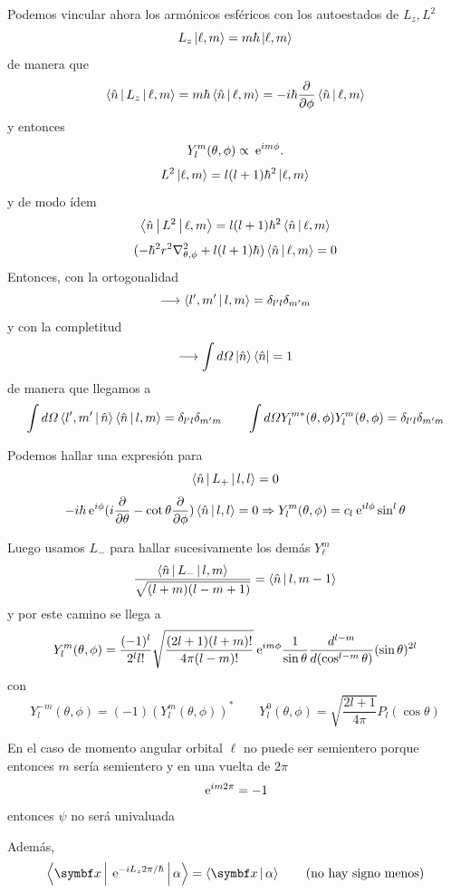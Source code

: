 \documentclass[10pt,oneside]{CBFT_book}
\begin{document}
Podemos vincular ahora los armónicos esféricos con los autoestados de $L_z,L^2$
\[
	L_z \Ket{\ell,m} = m\hbar\Ket{\ell,m}
\]
de manera que 
\[
	\Braket{\hat{n}|L_z|\ell,m} = m\hbar \Braket{\hat{n}|\ell,m} =
	-i\hbar \frac{\partial^{\hspace{-0.05em}} {}}{\partial {\phi}^{\hspace{-0.05em}}} \Braket{\hat{n}|\ell,m}
\]
y entonces 
\[
	Y_l^m(\theta,\phi) \propto \:\mathrm{e}^{im\phi}.
\]
\[
	L^2 \Ket{\ell,m} = l(l+1)\hbar^2\Ket{\ell,m}
\]
y de modo ídem
\[
	\Braket{\hat{n}|L^2|\ell,m} = l(l+1)\hbar^2\Braket{\hat{n}|\ell,m}
\]
\[
	( -\hbar^2 r^2 \nabla^2_{\theta,\phi} + l(l+1)\hbar )\Braket{\hat{n}|\ell,m} = 0 
\]
Entonces, con la ortogonalidad
\[
	\longrightarrow \Braket{l',m'|l,m} = \delta_{l'l} \delta_{m'm}
\]
y con la completitud 
\[
	\longrightarrow \int d\Omega \Ket{\hat{n}}\Bra{\hat{n}} = 1
\]
de manera que llegamos a 
\[
	\int d\Omega \Braket{l',m'|\hat{n}} \Braket{\hat{n}|l,m} = \delta_{l'l} \delta_{m'm}   \qquad 
	\int d\Omega Y_l^{m*}(\theta,\phi)  Y_l^m(\theta,\phi)  = \delta_{l'l} \delta_{m'm}
\]

Podemos hallar una expresión para 
\[
	\Braket{\hat{n}|L_+|l,l} = 0
\]
\[
	-i\hbar\:\mathrm{e}^{i\phi}(i\frac{\partial^{\hspace{-0.05em}} {}}{\partial {\theta}^{\hspace{-0.05em}}}-\cot\theta\frac{\partial^{\hspace{-0.05em}} {}}{\partial {\phi}^{\hspace{-0.05em}}})\Braket{\hat{n}|l,l} = 0 \Rightarrow
	Y_l^m(\theta,\phi)  = c_l \:\mathrm{e}^{il\phi}\sin^l\theta
\]

Luego usamos $L_-$ para hallar sucesivamente los demás $Y^m_\ell$
\[
	\frac{\Braket{\hat{n}|L_-|l,m} }{\sqrt{(l+m)(l-m+1)}} = \Braket{\hat{n}|l,m-1} 
\]
y por este camino se llega a 
\[
	Y_l^m(\theta,\phi) = \frac{(-1)^l}{2^ll!}\sqrt{\frac{(2l+1)(l+m)!}{4\pi(l-m)!}} \:\mathrm{e}^{im\phi} 
\frac{1}{\sin\theta}
	\frac{d^{\hspace{-0.05em}} {^{l-m}}}{d {(\cos^{l-m}\theta)}^{\hspace{-0.05em}}}(\sin\theta)^{2l}
\]
con 
\[
	Y_l^{-m}(\theta,\phi) = (-1)( Y_l^m(\theta,\phi) )^* \qquad 
	Y_l^0(\theta,\phi) = \sqrt{\frac{2l+1}{4\pi}}P_l(\cos\theta)
\]

En el caso de momento angular orbital $\ell$ no puede ser semientero porque entonces $m$ sería semientero y 
en una vuelta de $2\pi$
\[
	\:\mathrm{e}^{im2\pi} = -1
\]
entonces $\psi$ no será univaluada

Además,
\[
	\Braket{\vb{x}|\euler^{-iL_z2\pi/\hbar}|\alpha} = \Braket{\vb{x}|\alpha} \qquad \text{(no hay signo menos)}
\]


\end{document}
